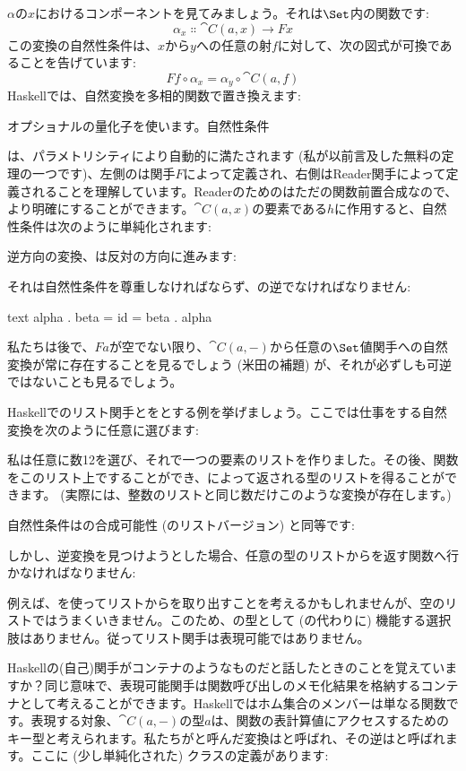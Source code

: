 $\alpha$の$x$におけるコンポーネントを見てみましょう。それは$\Set$内の関数です: 
\[\alpha_x \Colon \cat{C}(a, x) \to F x\]
この変換の自然性条件は、$x$から$y$への任意の射$f$に対して、次の図式が可換であることを告げています: 
\[F f \circ \alpha_x = \alpha_y \circ \cat{C}(a, f)\]
Haskellでは、自然変換を多相的関数で置き換えます: 

オプショナルの量化子を使います。自然性条件

は、パラメトリシティにより自動的に満たされます (私が以前言及した無料の定理の一つです)、左側のは関手$F$によって定義され、右側はReader関手によって定義されることを理解しています。Readerのためのはただの関数前置合成なので、より明確にすることができます。$\cat{C}(a, x)$の要素である$h$に作用すると、自然性条件は次のように単純化されます: 

逆方向の変換、は反対の方向に進みます: 

それは自然性条件を尊重しなければならず、の逆でなければなりません: 

\begin{snip}{text}
alpha . beta = id = beta . alpha
\end{snip}
私たちは後で、$F a$が空でない限り、$\cat{C}(a, -)$から任意の$\Set$値関手への自然変換が常に存在することを見るでしょう (米田の補題) が、それが必ずしも可逆ではないことも見るでしょう。

Haskellでのリスト関手とをとする例を挙げましょう。ここでは仕事をする自然変換を次のように任意に選びます: 

私は任意に数12を選び、それで一つの要素のリストを作りました。その後、関数をこのリスト上ですることができ、によって返される型のリストを得ることができます。 (実際には、整数のリストと同じ数だけこのような変換が存在します。) 

自然性条件はの合成可能性 (のリストバージョン) と同等です: 

しかし、逆変換を見つけようとした場合、任意の型のリストからを返す関数へ行かなければなりません: 

例えば、を使ってリストからを取り出すことを考えるかもしれませんが、空のリストではうまくいきません。このため、の型として (の代わりに) 機能する選択肢はありません。従ってリスト関手は表現可能ではありません。

Haskellの(自己)関手がコンテナのようなものだと話したときのことを覚えていますか？同じ意味で、表現可能関手は関数呼び出しのメモ化結果を格納するコンテナとして考えることができます。Haskellではホム集合のメンバーは単なる関数です。表現する対象、$\cat{C}(a, -)$の型$a$は、関数の表計算値にアクセスするためのキー型と考えられます。私たちがと呼んだ変換はと呼ばれ、その逆はと呼ばれます。ここに (少し単純化された) クラスの定義があります: 

